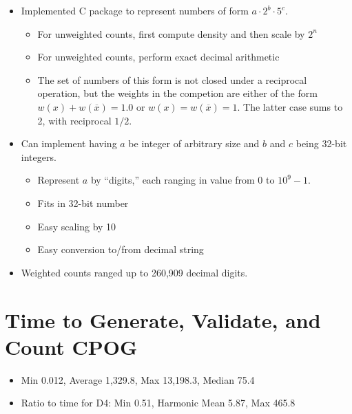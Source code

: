 \documentclass[letterpaper,USenglish,cleveref, autoref, thm-restate]{lipics-v2021}
\begin{document}
\begin{itemize}
\item Implemented C package to represent numbers of form $a \cdot 2^b \cdot 5^c$.
  \begin{itemize}
  \item For unweighted counts, first compute density and then scale by $2^n$
  \item For unweighted counts, perform exact decimal arithmetic
  \item The set of numbers of this form is not closed under a reciprocal operation, but the weights in the competion are either of the form
    $w(x) + w(\overline{x}) = 1.0$ or $w(x) = w(\overline{x}) = 1$.  The latter case sums to 2, with reciprocal $1/2$.
  \end{itemize}
\item Can implement having $a$ be integer of arbitrary size and $b$ and $c$ being 32-bit integers.
  \begin{itemize}
    \item Represent $a$ by ``digits,'' each ranging in value from $0$ to $10^9-1$.
    \item Fits in 32-bit number
    \item Easy scaling by 10
    \item Easy conversion to/from decimal string
  \end{itemize}
\item Weighted counts ranged up to 260,909 decimal digits.
\end{itemize}


\section*{Time to Generate, Validate, and Count CPOG}

\begin{itemize}
\item Min 0.012, Average 1,329.8, Max 13,198.3, Median 75.4
\item Ratio to time for D4: Min 0.51, Harmonic Mean 5.87, Max 465.8
\end{itemize}



\end{document}
